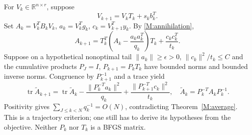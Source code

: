For $V_k\in\mathbb R^{n\times r}$, suppose
\[
 V_{k+1}=V_kT_k+s_kb_k^T.
\]
Set $A_k=V_k^TB_kV_k$, $a_k=V_k^Tg_k$, $c_k=V_{k+1}^Ty_k$. By \eqref{M:annihilation},
\begin{equation}\label{M:frameidentity}
 A_{k+1}=T_k^T\left(A_k-\frac{a_ka_k^T}{q_k}\right)T_k+\frac{c_kc_k^T}{t_k}.
\end{equation}
Suppose on a hypothetical nonoptimal tail $\|a_k\|\ge\epsilon>0$, $\|c_k\|^2/t_k\le C$ and the cumulative products $P_J=I$, $P_{k+1}=P_kT_k$ have bounded norms and bounded inverse norms. Congruence by $P_{k+1}^{-1}$ and a trace yield
\[
 \operatorname{tr}\widetilde A_{k+1}=\operatorname{tr}\widetilde A_k
 -\frac{\|P_k^{-T}a_k\|^2}{q_k}
 +\frac{\|P_{k+1}^{-T}c_k\|^2}{t_k},\quad
 \widetilde A_k=P_k^{-T}A_kP_k^{-1}.
\]
Positivity gives $\sum_{J\le k<N}q_k^{-1}=O(N)$, contradicting Theorem~\ref{M:average}. This is a trajectory criterion; one still has to derive its hypotheses from the objective. Neither $P_k$ nor $T_k$ is a BFGS matrix.

